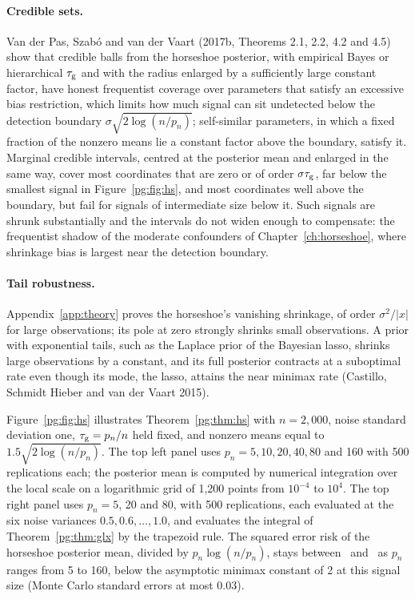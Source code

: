 \paragraph{Credible sets.} Van der Pas, Szab\'o and van der Vaart (2017b, Theorems 2.1, 2.2, 4.2 and 4.5) show that credible balls from the horseshoe posterior, with empirical Bayes or hierarchical $\tau_{\mathrm{g}}$ and with the radius enlarged by a sufficiently large constant factor, have honest frequentist coverage over parameters that satisfy an excessive bias restriction, which limits how much signal can sit undetected below the detection boundary $\sigma\sqrt{2\log(n/p_n)}$; self-similar parameters, in which a fixed fraction of the nonzero means lie a constant factor above the boundary, satisfy it. Marginal credible intervals, centred at the posterior mean and enlarged in the same way, cover most coordinates that are zero or of order $\sigma\tau_{\mathrm{g}}$, far below the smallest signal in Figure~\ref{pg:fig:hs}, and most coordinates well above the boundary, but fail for signals of intermediate size below it. Such signals are shrunk substantially and the intervals do not widen enough to compensate: the frequentist shadow of the moderate confounders of Chapter~\ref{ch:horseshoe}, where shrinkage bias is largest near the detection boundary.

\paragraph{Tail robustness.} Appendix~\ref{app:theory} proves the horseshoe's vanishing shrinkage, of order $\sigma^2/\lvert x\rvert$ for large observations; its pole at zero strongly shrinks small observations. A prior with exponential tails, such as the Laplace prior of the Bayesian lasso, shrinks large observations by a constant, and its full posterior contracts at a suboptimal rate even though its mode, the lasso, attains the near minimax rate (Castillo, Schmidt Hieber and van der Vaart 2015).

Figure~\ref{pg:fig:hs} illustrates Theorem~\ref{pg:thm:hs} with $n = 2{,}000$, noise standard deviation one, $\tau_{\mathrm{g}} = p_n/n$ held fixed, and nonzero means equal to $1.5\sqrt{2\log(n/p_n)}$. The top left panel uses $p_n = 5, 10, 20, 40, 80$ and 160 with 500 replications each; the posterior mean is computed by numerical integration over the local scale on a logarithmic grid of 1,200 points from $10^{-4}$ to $10^4$. The top right panel uses $p_n = 5$, 20 and 80, with 500 replications, each evaluated at the six noise variances $0.5, 0.6, \ldots, 1.0$, and evaluates the integral of Theorem~\ref{pg:thm:glx} by the trapezoid rule. The squared error risk of the horseshoe posterior mean, divided by $p_n\log(n/p_n)$, stays between \pgqmin\ and \pgqmax\ as $p_n$ ranges from 5 to 160, below the asymptotic minimax constant of 2 at this signal size (Monte Carlo standard errors at most 0.03).

